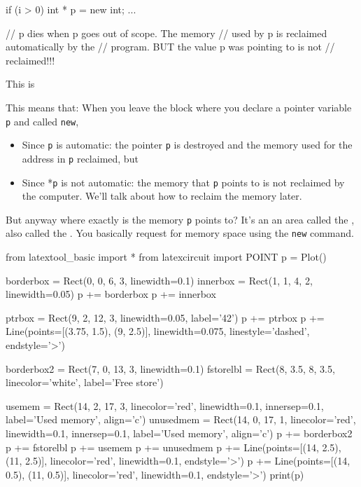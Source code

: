\begin{consolethree}[escapeinside=||]
if (i > 0)
{
    int * p = new int;
    ...
}

// p dies when p goes out of scope. The memory
// used by p is reclaimed automatically by the
// program. BUT the value p was pointing to is not
// reclaimed!!! 
\end{consolethree}
This is 

This means that: When you leave the block where you declare a pointer variable \texttt{p} and called \texttt{new},

\begin{itemize}
\item
  Since \texttt{p} is automatic: the pointer \texttt{p} is destroyed and the
  memory used for the address in \texttt{p} reclaimed, but
\item
  Since *\texttt{p} is not automatic: the memory that \texttt{p} points to is not reclaimed by the computer. We'll talk about how to reclaim the memory later.
\end{itemize}

But anyway where exactly is the memory \texttt{p} points to? It's an an area called the , also called the . You basically request for memory space using the \texttt{new} command.
\begin{python}
from latextool_basic import *
from latexcircuit import POINT
p = Plot()

borderbox = Rect(0, 0, 6, 3, linewidth=0.1)
innerbox = Rect(1, 1, 4, 2, linewidth=0.05)
p += borderbox
p += innerbox

ptrbox = Rect(9, 2, 12, 3, linewidth=0.05, label='42')
p += ptrbox
p += Line(points=[(3.75, 1.5), (9, 2.5)], linewidth=0.075, linestyle='dashed', endstyle='>')

borderbox2 = Rect(7, 0, 13, 3, linewidth=0.1)
fstorelbl = Rect(8, 3.5, 8, 3.5, linecolor='white', label='Free store')

usemem = Rect(14, 2, 17, 3, linecolor='red', linewidth=0.1, innersep=0.1, label='Used memory', align='c')
unusedmem = Rect(14, 0, 17, 1, linecolor='red', linewidth=0.1, innersep=0.1, label='Used memory', align='c')
p += borderbox2
p += fstorelbl
p += usemem
p += unusedmem
p += Line(points=[(14, 2.5), (11, 2.5)], linecolor='red', linewidth=0.1, endstyle='>')
p += Line(points=[(14, 0.5), (11, 0.5)], linecolor='red', linewidth=0.1, endstyle='>')
print(p)
\end{python}

